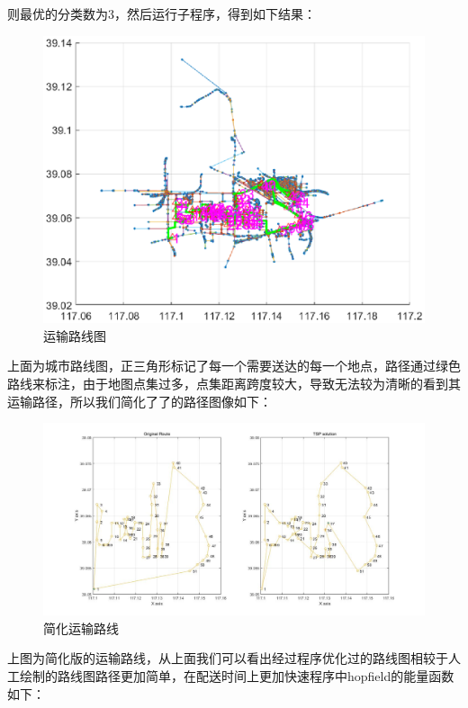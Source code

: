 则最优的分类数为3，然后运行子程序，得到如下结果：
\begin{figure}[H]
    \centering
    \includegraphics[width=13cm]{figure/city_path.eps}
    \caption{运输路线图}
    \label{fig:city_path}
\end{figure}
上面为城市路线图，正三角形标记了每一个需要送达的每一个地点，路径通过绿色路线来标注，由于地图点集过多，点集距离跨度较大，导致无法较为清晰的看到其运输路径，所以我们简化了了的路径图像如下：
\begin{figure}[H]
    \centering
    \includegraphics[width=13cm]{figure/easy_path.jpg}
    \caption{简化运输路线}
    \label{fig:easy_path}
\end{figure}
上图为简化版的运输路线，从上面我们可以看出经过程序优化过的路线图相较于人工绘制的路线图路径更加简单，在配送时间上更加快速程序中hopfield的能量函数如下：
